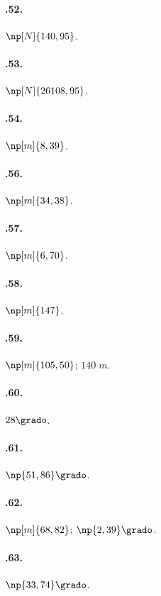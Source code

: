 \begin{multicols}{3}
\paragraph{\thechapter.52.}$\np[N]{140,95}$.

\paragraph{\thechapter.53.}$\np[N]{26108,95}$.

\paragraph{\thechapter.54.}$\np[m]{8,39}$.

\paragraph{\thechapter.56.}$\np[m]{34,38}$.

\paragraph{\thechapter.57.}$\np[m]{6,70}$.

\paragraph{\thechapter.58.}$\np[m]{147}$.

\paragraph{\thechapter.59.}$\np[m]{105,50}$; $140\;\unit{m}$.

\paragraph{\thechapter.60.}$28\grado$.

\paragraph{\thechapter.61.}$\np{51,86}\grado$.

\paragraph{\thechapter.62.}$\np[m]{68,82}$; $\np{2,39}\grado$.

\paragraph{\thechapter.63.}$\np{33,74}\grado$.


\end{multicols}
